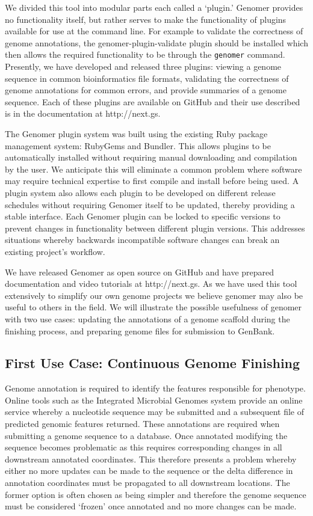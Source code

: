 \documentclass[10pt]{article}
\begin{document}
We divided this tool into modular parts each called a `plugin.' Genomer
provides no functionality itself, but rather serves to make the functionality
of plugins available for use at the command line. For example to validate the
correctness of genome annotations, the genomer-plugin-validate plugin should be
installed which then allows the required functionality to be through the
\verb+genomer+ command. Presently, we have developed and released three
plugins: viewing a genome sequence in common bioinformatics file formats,
validating the correctness of genome annotations for common errors, and provide
summaries of a genome sequence. Each of these plugins are available on GitHub
and their use described is in the documentation at http://next.gs.

The Genomer plugin system was built using the existing Ruby package management
system: RubyGems and Bundler. This allows plugins to be automatically installed
without requiring manual downloading and compilation by the user. We anticipate
this will eliminate a common problem where software may require technical
expertise to first compile and install before being used. A plugin system also
allows each plugin to be developed on different release schedules without
requiring Genomer itself to be updated, thereby providing a stable interface.
Each Genomer plugin can be locked to specific versions to prevent changes in
functionality between different plugin versions. This addresses situations
whereby backwards incompatible software changes can break an existing project's
workflow.

We have released Genomer as open source on GitHub \cite{genomer-github} and
have prepared documentation and video tutorials at http://next.gs. As we have
used this tool extensively to simplify our own genome projects we believe
genomer may also be useful to others in the field. We will illustrate the
possible usefulness of genomer with two use cases: updating the annotations of
a genome scaffold during the finishing process, and preparing genome files for
submission to GenBank.

\subsection*{First Use Case: Continuous Genome Finishing}

Genome annotation is required to identify the features responsible for
phenotype. Online tools such as the Integrated Microbial Genomes system
\cite{markowitz2006} provide an online service whereby a nucleotide sequence
may be submitted and a subsequent file of predicted genomic features returned.
These annotations are required when submitting a genome sequence to a database.
Once annotated modifying the sequence becomes problematic as this requires
corresponding changes in all downstream annotated coordinates. This therefore
presents a problem whereby either no more updates can be made to the sequence
or the delta difference in annotation coordinates must be propagated to all
downstream locations. The former option is often chosen as being simpler and
therefore the genome sequence must be considered `frozen' once annotated and no
more changes can be made.
\end{document}
